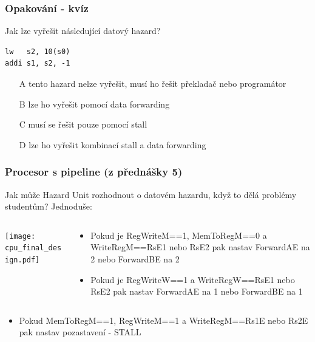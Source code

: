 \documentclass{beamer}
\begin{document}
\begin{frame}[fragile]
\frametitle{Opakování - kvíz}

Jak lze vyřešit následující datový hazard?

\begin{verbatim}
lw   s2, 10(s0)
addi s1, s2, -1 
\end{verbatim}
\bigskip
\begin{itemize}
 \item[A] tento hazard nelze vyřešit, musí ho řešit překladač nebo programátor
 \item[B] lze ho vyřešit pomocí data forwarding
 \item[C] musí se řešit pouze pomocí stall
 \item[D] lze ho vyřešit kombinací stall a data forwarding
\end{itemize}

\end{frame}


\begin{frame}

\frametitle{Procesor s pipeline (z přednášky 5)}

Jak může Hazard Unit rozhodnout o datovém hazardu, když to dělá problémy studentům? Jednoduše:
\begin{columns}
\begin{column}{0.67\textwidth}
\texttt{[image: cpu\_final\_design.pdf]}
\end{column}
\begin{column}{0.33\textwidth}
\footnotesize
\begin{itemize}
\item Pokud je RegWriteM==1, MemToRegM==0 a WriteRegM==RsE1 nebo RsE2 pak nastav ForwardAE na 2 nebo ForwardBE na 2
\item Pokud je RegWriteW==1 a WriteRegW==RsE1 nebo RsE2 pak nastav ForwardAE na 1 nebo ForwardBE na 1
\end{itemize}
\end{column}
\end{columns}
\bigskip
\footnotesize
\begin{itemize}
\item Pokud MemToRegM==1, RegWriteM==1 a WriteRegM==Rs1E nebo Rs2E pak nastav pozastavení - STALL
\end{itemize}
\end{frame}
\end{document}
